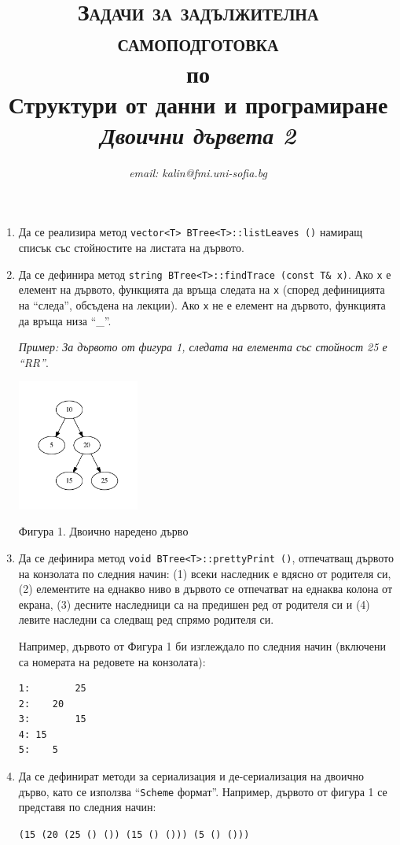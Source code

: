 \documentclass[12pt,a4paper]{article}
\author{\textit{email: kalin@fmi.uni-sofia.bg}}
\title{\textsc{Задачи за задължителна самоподготовка} \\
по \\
Структури от данни и програмиране\\
\textit{Двоични дървета 2}}
\begin{document}
\maketitle


\begin{enumerate}

	\item Да се реализира метод \texttt{vector<T> BTree<T>::listLeaves ()} намиращ списък със стойностите на листата на дървото.

	\item Да се дефинира метод \texttt{string BTree<T>::findTrace (const T\& x)}. Ако \texttt{x} е елемент на дървото, функцията да връща следата на \texttt{x} (според дефиницията на ``следа'', обсъдена на лекции). Ако \texttt{x} не е елемент на дървото, функцията да връща низа ``\_''.

	\textit{Пример: За дървото от фигура 1, следата на елемента със стойност 25 е ``RR''}.

	\begin{flushleft}
	\includegraphics[width=4cm]{images/tree1}

	Фигура 1. Двоично наредено дърво
	\end{flushleft}

	\item Да се дефинира метод \texttt{void BTree<T>::prettyPrint ()}, отпечатващ дървото на конзолата по следния начин: (1) всеки наследник е вдясно от родителя си, (2) елементите на еднакво ниво в дървото се отпечатват на еднаква колона от екрана, (3) десните наследници са на предишен ред от родителя си и (4) левите наследни са следващ ред спрямо родителя си.

	Например, дървото от Фигура 1 би изглеждало по следния начин (включени са номерата на редовете на конзолата):

\begin{verbatim}
1:        25
2:    20	
3:        15
4: 15
5:    5
\end{verbatim}

	\item Да се дефинират методи за сериализация и де-сериализация на двоично дърво, като се използва ``\texttt{Scheme} формат''. Например, дървото от фигура 1 се представя по следния начин:

	\texttt{(15 (20 (25 () ()) (15 () ())) (5 () ()))}



\end{enumerate}
\end{document}
